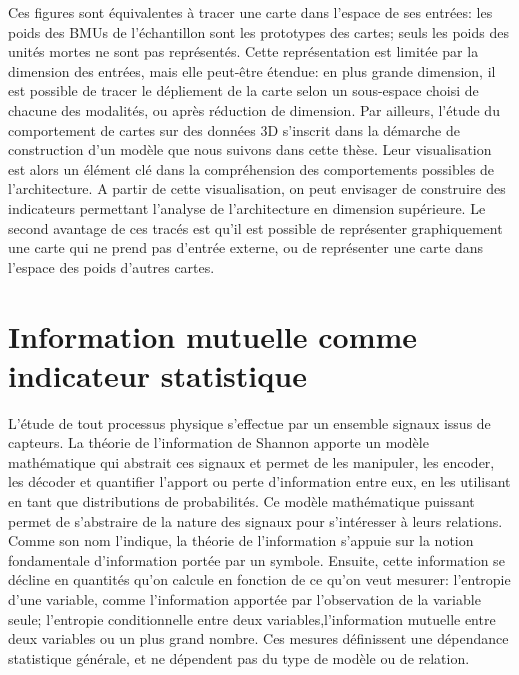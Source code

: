 Ces figures sont équivalentes à tracer une carte dans l'espace de ses entrées: les poids des BMUs de l'échantillon sont les prototypes des cartes; seuls les poids des unités mortes ne sont pas représentés.
Cette représentation est limitée par la dimension des entrées, mais elle peut-être étendue: en plus grande dimension, il est possible de tracer le dépliement de la carte selon un sous-espace choisi de chacune des modalités, ou après réduction de dimension.
Par ailleurs, l'étude du comportement de cartes sur des données 3D s'inscrit dans la démarche de construction d'un modèle que nous suivons dans cette thèse. Leur visualisation est alors un élément clé dans la compréhension des comportements possibles de l'architecture. A partir de cette visualisation, on peut envisager de construire des indicateurs permettant l'analyse de l'architecture en dimension supérieure. 
Le second avantage de ces tracés est qu'il est possible de représenter graphiquement une carte qui ne prend pas d'entrée externe, ou de représenter une carte dans l'espace des poids d'autres cartes.

\section{Information mutuelle comme indicateur statistique}

L'étude de tout processus physique s'effectue par un ensemble signaux issus de capteurs. La théorie de l'information de Shannon \cite{Shannon1948AMT} apporte un modèle mathématique qui abstrait ces signaux et permet de les manipuler, les encoder, les décoder et quantifier l'apport ou perte d'information entre eux, en les utilisant en tant que distributions de probabilités.
Ce modèle mathématique puissant permet de s'abstraire de la nature des signaux pour s'intéresser à leurs relations. Comme son nom l'indique, la théorie de l'information s'appuie sur la notion fondamentale d'information portée par un symbole. Ensuite, cette information se décline en quantités qu'on calcule en fonction de ce qu'on veut mesurer: l'entropie d'une variable, comme l'information apportée par l'observation de la variable seule; l'entropie conditionnelle entre deux variables,l'information mutuelle entre deux variables ou un plus grand nombre. Ces mesures définissent une dépendance statistique générale, et ne dépendent pas du type de modèle ou de relation.

